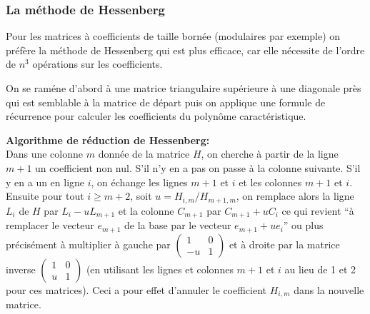 \documentclass[a4paper,11pt]{article}
\begin{document}
\begin{giacjshere}
\subsubsection{La m\'ethode de Hessenberg}
Pour les matrices \`a coefficients de taille born\'ee (modulaires par exemple)
on préfère la m\'ethode de Hessenberg qui est plus
efficace, car elle n\'ecessite de l'ordre de $n^3$ op\'erations sur
les coefficients.

On se ram\'ene d'abord \`a une matrice triangulaire supérieure à
une diagonale près qui est semblable \`a la
matrice de d\'epart puis on
applique une formule de r\'ecurrence pour calculer les coefficients
du polyn\^ome caract\'eristique.

{\bf Algorithme de réduction de Hessenberg:}\\
Dans une colonne $m$ donnée de la matrice $H$, 
on cherche à partir de la ligne
$m+1$ un coefficient non nul. S'il n'y en a pas on passe à la colonne
suivante. S'il y en a un en ligne $i$, on échange les lignes $m+1$
et $i$ et les colonnes $m+1$ et $i$. Ensuite pour tout $i\geq m+2$,
soit $u=H_{i,m}/H_{m+1,m}$, on remplace alors la ligne $L_i$ de $H$
par $L_i-uL_{m+1}$ et la colonne $C_{m+1}$ par $C_{m+1}+uC_i$
ce qui revient ``à remplacer le vecteur $e_{m+1}$ de la base
par le vecteur $e_{m+1}+ue_i$'' ou plus pr\'ecis\'ement
\`a multiplier \`a gauche par $\left(\begin{array}{cc}
1 & 0 \\ -u & 1\end{array}\right)$ et \`a droite par la matrice inverse
$\left(\begin{array}{cc}
1 & 0 \\ u & 1\end{array}\right)$ (en utilisant les lignes et colonnes
$m+1$ et $i$ au lieu de 1 et 2 pour ces matrices). 
Ceci a pour effet d'annuler le coefficient $H_{i,m}$
dans la nouvelle matrice.


\end{giacjshere}
\end{document}
